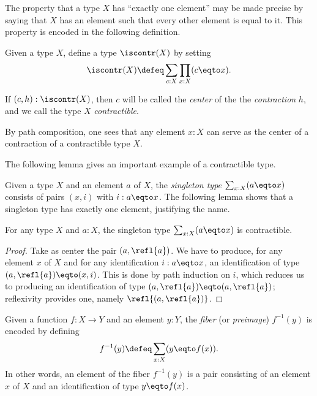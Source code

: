 The property that a type $X$ has ``exactly one element'' may be made precise
by saying that $X$ has an element such that every other element is equal to it.
This property is encoded in the following definition.

\begin{definition}
  \label{def:contractible}
  Given a type $X$, define a type $\iscontr(X)$ by setting
  \[
    \iscontr(X) \defeq \sum_{c:X} \prod_{x:X} (c \eqto x).\qedhere
  \]
\end{definition}

If $ (c,h) : \iscontr(X) $, then $c$ will be called the \emph{center} of the
the \emph{contraction} $h$, and we call the type $X$ \emph{contractible}.

By path composition, one sees that any element $x : X$ can serve as the center of a contraction of a contractible type $X$.

The following lemma gives an important example of a contractible type.

Given a type $X$ and an element $a$ of $X$,
the \emph{singleton type} $\sum_{x:X} (a \eqto x)$
consists of pairs $(x,i)$ with $i: a \eqto x$. The following lemma shows that a singleton type has exactly one element, justifying the name.

\begin{lemma}\label{lem:thepathspaceiscontractible}
For any type $X$ and $a:X$, the singleton type $\sum_{x:X} (a \eqto x)$ is contractible.
\end{lemma}

\begin{proof}
Take as center the pair $(a,\refl{a})$. We have
to produce, for any element $x$ of $X$ and for any identification
$i: a \eqto x$, an identification of type $(a,\refl{a}) \eqto (x,i)$.  This is done by path induction on $i$, which reduces us to producing
an identification of type $(a,\refl{a}) \eqto (a,\refl{a})$; reflexivity provides one, namely $\refl{(a,\refl{a})}$.
\end{proof}

\begin{definition}
\label{def:fiber}
Given a function $f : X \to Y$ and an element $y:Y$,
the \emph{fiber} (or \emph{preimage}) $f^{-1}(y)$
is encoded by defining $$f^{-1}(y) \defeq \sum_{x:X}(y \eqto f(x)).$$
In other words, an element of the fiber $f^{-1}(y)$ is a pair consisting
of an element $x$ of $X$ and an identification of type $y \eqto f(x)$.
\end{definition}

